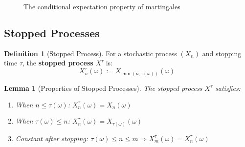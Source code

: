 \documentclass[11pt,a4paper]{article}
\theoremstyle{plain}
\newtheorem{lemma}[theorem]{Lemma}
\theoremstyle{definition}
\newtheorem{definition}[theorem]{Definition}
\newcommand{\FF}{\mathcal{F}}
\newcommand{\EE}{\mathbb{E}}
\begin{document}
\begin{figure}[htbp]
\centering
{}
\caption{The conditional expectation property of martingales}
\label{fig:martingale}
\end{figure}

\subsection{Stopped Processes}

\begin{definition}[Stopped Process]
\label{def:stopped-process}
For a stochastic process $(X_n)$ and stopping time $\tau$, 
the \textbf{stopped process} $X^\tau$ is:
\[
  X^\tau_n(\omega) := X_{\min(n, \tau(\omega))}(\omega)
\]
\end{definition}

\begin{lemma}[Properties of Stopped Processes]
\label{lem:stopped-process-properties}
The stopped process $X^\tau$ satisfies:
\begin{enumerate}[label=(\roman*)]
  \item When $n \leq \tau(\omega)$: $X^\tau_n(\omega) = X_n(\omega)$
  \item When $\tau(\omega) \leq n$: $X^\tau_n(\omega) = X_{\tau(\omega)}(\omega)$
  \item Constant after stopping: $\tau(\omega) \leq n \leq m \Rightarrow X^\tau_m(\omega) = X^\tau_n(\omega)$
\end{enumerate}
\end{lemma}
\end{document}

